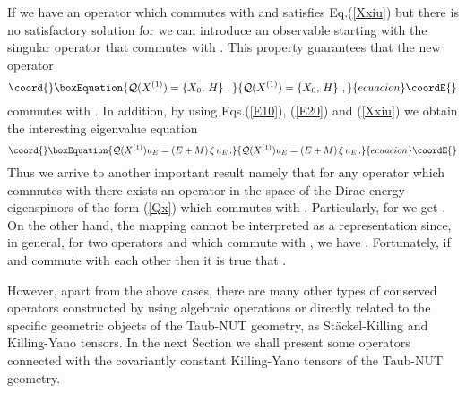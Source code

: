 \documentclass[a4paper,12pt]{article}
\begin{document}
If we have an operator \coordHE{} which commutes with \myHighlight{$\Delta$}\coordHE{} and 
satisfies Eq.(\ref{Xxiu}) but there is no satisfactory solution for \coordHE{} 
we can introduce  an observable starting with the singular operator 
\coordHE{} that commutes with \coordHE{}. This property 
guarantees that the new operator
\begin{equation}\coord{}\boxEquation{\label{Qx}
{\cal Q}(X^{(1)})=\left\{X_{0},\,H \right\}\,, 
}{{\cal Q}(X^{(1)})=\left\{X_{0},\,H \right\}\,, 
}{ecuacion}\coordE{}\end{equation}
commutes with \coordHE{}. In addition, by using Eqs.(\ref{E10}), (\ref{E20}) and 
(\ref{Xxiu}) we obtain the interesting eigenvalue equation 
\begin{equation}\coord{}\boxEquation{\label{lugu}
{\cal Q}(X^{(1)}) u_{E}= (E+M)\,\xi\,u_{E}\,. 
}{{\cal Q}(X^{(1)}) u_{E}= (E+M)\,\xi\,u_{E}\,. 
}{ecuacion}\coordE{}\end{equation} 
Thus we arrive to another important result namely that for any operator 
which commutes with \myHighlight{$\Delta$}\coordHE{} there exists an operator in the space of the Dirac 
energy eigenspinors \coordHE{} of the form (\ref{Qx}) which commutes with 
\coordHE{}. Particularly, for \coordHE{}  we get \coordHE{}.  
On the other hand, the mapping \coordHE{} cannot be 
interpreted as a representation since, in general, for two operators 
\coordHE{} and \coordHE{} which commute with \myHighlight{$\Delta$}\coordHE{}, we have 
\coordHE{}. 
Fortunately, if \coordHE{} and \coordHE{} commute with each other then it is true 
that \coordHE{}. 

However, apart from the above cases, there are many other types of conserved 
operators constructed by using algebraic operations or directly related to 
the specific geometric objects of the Taub-NUT geometry, as St\" ackel-Killing 
and Killing-Yano tensors. In the next Section we shall present some 
operators connected with the covariantly constant 
Killing-Yano tensors of the Taub-NUT geometry.
\end{document}
